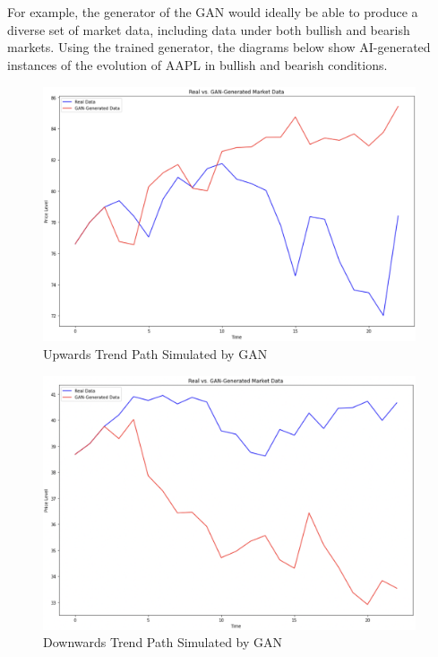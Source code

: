 \\ \\
For example, the generator of the GAN would ideally be able to produce a diverse set of market data, including data under both bullish and bearish markets. Using the trained generator, the diagrams below show AI-generated instances of the evolution of AAPL in bullish and bearish conditions.
\begin{figure}[h]
\centering
\includegraphics[width=11cm]{templates/assets/gan/gan_up.png}
\caption{Upwards Trend Path Simulated by GAN}
\end{figure}
\begin{figure}[h]
\centering
\includegraphics[width=11cm]{templates/assets/gan/gan_down.png}
\caption{Downwards Trend Path Simulated by GAN}
\end{figure}
\\
